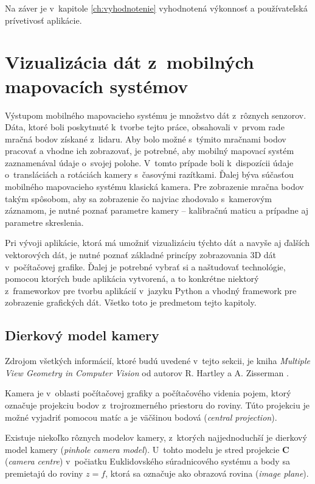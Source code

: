 Na záver je v~kapitole \ref{ch:vyhodnotenie} vyhodnotená výkonnosť a používateľská prívetivosť aplikácie. 

\chapter{Vizualizácia dát z~mobilných mapovacích systémov}
\label{ch:teoria}

Výstupom mobilného mapovacieho systému je množstvo dát z~rôznych senzorov. Dáta, ktoré boli poskytnuté k~tvorbe tejto práce, obsahovali v~prvom rade mračná bodov získané z~lidaru. Aby bolo možné s~týmito mračnami bodov pracovať a vhodne ich zobrazovať, je potrebné, aby mobilný mapovací systém zaznamenával údaje o~svojej polohe. V~tomto prípade boli k~dispozícii údaje o~transláciách a rotáciách kamery s~časovými razítkami. Ďalej býva súčasťou mobilného mapovacieho systému klasická kamera. Pre zobrazenie mračna bodov takým spôsobom, aby sa zobrazenie čo najviac zhodovalo s~kamerovým záznamom, je nutné poznať parametre kamery -- kalibračnú maticu a prípadne aj parametre skreslenia.

Pri vývoji aplikácie, ktorá má umožniť vizualizáciu týchto dát a navyše aj ďalších vektorových dát, je nutné poznať základné princípy zobrazovania 3D dát v~počítačovej grafike. Ďalej je potrebné vybrať si a naštudovať technológie, pomocou ktorých bude aplikácia vytvorená, a to konkrétne niektorý z~frameworkov pre tvorbu aplikácií v~jazyku Python a vhodný framework pre zobrazenie grafických dát. Všetko toto je predmetom tejto kapitoly.

\section{Dierkový model kamery}

Zdrojom všetkých informácií, ktoré budú uvedené v~tejto sekcii, je kniha \emph{Multiple View Geometry in Computer Vision} od autorov R. Hartley a A. Zisserman \cite{multiple_view_geometry}.

Kamera je v~oblasti počítačovej grafiky a počítačového videnia pojem, ktorý označuje projekciu bodov z~trojrozmerného priestoru do roviny. Túto projekciu je možné vyjadriť pomocou matíc a je väčšinou bodová (\emph{central projection}).

Existuje niekoľko rôznych modelov kamery, z~ktorých najjednoduchší je dierkový model kamery (\emph{pinhole camera model}). U~tohto modelu je stred projekcie $\mathbf{C}$  (\emph{camera centre}) v~počiatku Euklidovského súradnicového systému a body sa premietajú do roviny $z = f$, ktorá sa označuje ako obrazová rovina (\emph{image plane}).

